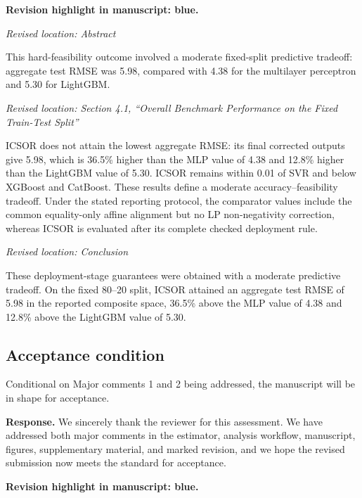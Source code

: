\documentclass[11pt,a4paper]{article}
\newcommand{\revisionnotice}{\par\noindent\textcolor{revisionblue}{\textbf{Revision highlight in manuscript: blue.}}\par}
\newcommand{\excerptlocation}[1]{\par\noindent\textit{Revised location: #1}\par}
\begin{document}
\revisionnotice

\excerptlocation{Abstract}
\begin{revisionexcerpt}
This hard-feasibility outcome involved a moderate fixed-split predictive tradeoff: aggregate test RMSE was 5.98, compared with 4.38 for the multilayer perceptron and 5.30 for LightGBM.
\end{revisionexcerpt}

\excerptlocation{Section 4.1, ``Overall Benchmark Performance on the Fixed Train-Test Split''}
\begin{revisionexcerpt}
ICSOR does not attain the lowest aggregate RMSE: its final corrected outputs give 5.98, which is 36.5\% higher than the MLP value of 4.38 and 12.8\% higher than the LightGBM value of 5.30. ICSOR remains within 0.01 of SVR and below XGBoost and CatBoost. These results define a moderate accuracy--feasibility tradeoff. Under the stated reporting protocol, the comparator values include the common equality-only affine alignment but no LP non-negativity correction, whereas ICSOR is evaluated after its complete checked deployment rule.
\end{revisionexcerpt}

\excerptlocation{Conclusion}
\begin{revisionexcerpt}
These deployment-stage guarantees were obtained with a moderate predictive tradeoff. On the fixed 80--20 split, ICSOR attained an aggregate test RMSE of 5.98 in the reported composite space, 36.5\% above the MLP value of 4.38 and 12.8\% above the LightGBM value of 5.30.
\end{revisionexcerpt}

\subsection*{Acceptance condition}

\begin{reviewercomment}
Conditional on Major comments 1 and 2 being addressed, the manuscript will be in shape for acceptance.
\end{reviewercomment}

\noindent\textbf{Response.} We sincerely thank the reviewer for this assessment. We have addressed both major comments in the estimator, analysis workflow, manuscript, figures, supplementary material, and marked revision, and we hope the revised submission now meets the standard for acceptance.

\revisionnotice
\end{document}
